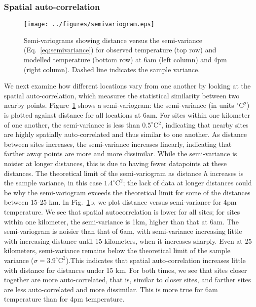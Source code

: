 \documentclass[draft,linenumbers]{agujournal}
\begin{document}
\subsubsection{Spatial auto-correlation}
\begin{figure}
\centering
\texttt{[image: ../figures/semivariogram.eps]}
\caption{Semi-variograms showing distance versus the semi-variance (Eq.~\ref{eq:semivariance}) for observed temperature (top row) and modelled temperature (bottom row) at 6am (left column) and 4pm (right column). Dashed line indicates the sample variance. 
}\label{fig:semiv_obs}
\end{figure}
We next examine how different locations vary from one another by looking at the spatial auto-correlation, which measures the statistical similarity between two nearby points. Figure~\ref{fig:semiv_obs} shows a semi-variogram: the semi-variance (in units $^\circ$C$^2$) is plotted against distance for all locations at 6am. For sites within one kilometer of one another, the semi-variance is less than $0.5^\circ$C$^2$, indicating that nearby sites are highly spatially auto-correlated and thus similar to one another. 
As distance between sites increases, the semi-variance increases linearly, indicating that farther away points are more and more dissimilar. While the semi-variance is noisier at longer distances, this is due to having fewer datapoints at these distances. 
The theoretical limit of the semi-variogram as distance $h$ increases is the sample variance, in this case $1.4^{\circ} \text{C} ^2$; the lack of data at longer distances could be why the semi-variogram exceeds the theoretical limit for some of the distances between 15-25 km. 
In Fig.~\ref{fig:semiv_obs}b, we plot distance versus semi-variance for 4pm temperature. We see that spatial autocorrelation is lower for all sites; for sites within one kilometer, the semi-variance is 1km, higher than that at 6am. The semi-variogram is noisier than that of 6am, with semi-variance increasing little with increasing distance until 15 kilometers, when it increases sharply. Even at 25 kilometers, semi-variance remains below the theoretical limit of the sample variance ($\sigma = 3.9^\circ \text{C}^2$).This indicates that spatial auto-correlation increases little with distance for distances under 15 km.
For both times, we see that sites closer together are more auto-correlated, that is, similar to closer sites, and farther sites are less auto-correlated and more dissimilar. This is more true for 6am temperature than for 4pm temperature. 
\end{document}
